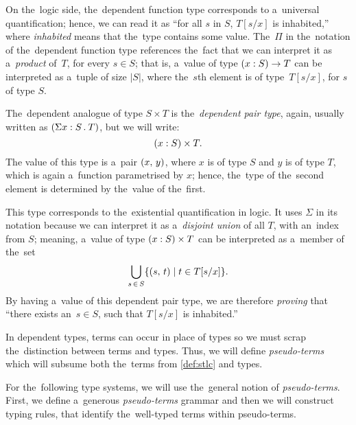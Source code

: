 On the~logic side, the~dependent function type corresponds to a~universal
quantification; hence, we can read it as ``for all $s$ in $S$, $T[s/x]$ is
inhabited,'' where \emph{inhabited} means that the~type contains some value.
The~$\Pi$ in the~notation of the~dependent function type references the~fact
that we can interpret it as a~\emph{product} of \,$T$, for every $s \in S$; that
is, a~value of type $(x : S) \to T$ can be interpreted as a~tuple of size $|S|$,
where the~$s$th element is of type \,$T[s/x]$, for $s$ of type $S$.

The~dependent analogue of type $S \times T$ is the~\emph{dependent pair type},
again, usually written as ${(\Sigma x \overset{}: S \, . \: T)}$, but we will write:
\[
  (x \overset{}: S) \times T.
\]
The value of this type is a~pair $(x, \, y)$, where $x$ is of type $S$ and $y$
is of type $T$, which is again a~function parametrised by $x$; hence, the~type
of the~second element is determined by the~value of the~first.

This type corresponds to the~existential quantification in logic. It uses
$\Sigma$ in its notation because we can interpret it as a~\emph{disjoint union}
of all $T$, with an~index from $S$; meaning, a~value of type
$(x \overset{}: S) \times T$ can be interpreted as a~member of the~set
\[
  \bigcup_{s \, \in \, S} \{ (s, \, t) \mid t \in T[s/x] \}.
\]
By having a~value of this dependent pair type, we are therefore \emph{proving}
that ``there exists an~$s \in S$, such that $T[s/x]$ is inhabited.''

In dependent types, terms can occur in place of types so we must scrap
the~distinction between terms and types. Thus, we will define
\emph{pseudo-terms} which will subsume both the~terms from \autoref{def:stlc}
and types.


For the~following type systems, we will use the~general notion of
\emph{pseudo-terms}. First, we define a~generous \emph{pseudo-terms} grammar and
then we will construct typing rules, that identify the~well-typed terms within
pseudo-terms.

